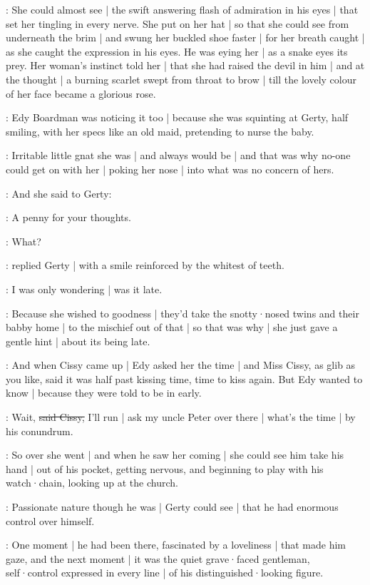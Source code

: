 \gertySex:
She could almost see |
the swift answering flash of admiration in his eyes |
that set her tingling
in every nerve.
She put on her hat |
so that she could see from underneath
the brim |
and swung her buckled shoe faster |
for her breath caught |
as she caught the expression
in his eyes.
He was eying her |
as a snake eyes its prey.
Her woman's instinct told her |
that she had raised the devil in him |
and at the thought |
a burning scarlet
swept from throat to brow |
till the lovely colour of her face
became a glorious rose.%

:
Edy Boardman was noticing it too |
because she was squinting at Gerty,
half smiling,
with her specs
like an old maid,
pretending to nurse the baby.

\gertyJudgy:
Irritable little gnat she was |
and always would be |
and that was why no-one could get on with her |
poking her nose |
into what was no concern of hers.

:
And she said to Gerty:

\edy:
A penny for your thoughts.

\gerty:
What?

:
replied Gerty |
with a smile reinforced by the whitest of teeth.

\gerty:
I was only wondering |
was it late.

\gertyJudgy:
Because she wished to goodness |
they'd take the snotty·nosed twins and their babby home |
to the mischief
out of that |%
so that was why |
she just gave a gentle hint |
about its being late.

:
And when Cissy came up |
Edy asked her the time |
and Miss Cissy,
as glib as you like,
said it was half past kissing time,
time to kiss again.
But Edy wanted to know |
because they were told
to be in early.

\cissy:
Wait,
\sout{said Cissy,}
I'll run |
ask my uncle Peter over there |
what's the time |
by his conundrum.

:
So over she went |
and when he saw her coming |
she could see him take his hand |
out of his pocket,
getting nervous,
and beginning to play with his watch·chain,
looking up at the church.

\gertySex:
Passionate nature though he was |
Gerty could see |
that he had enormous control over himself.%

\gertyNovel:
One moment |
he had been there,
fascinated by a loveliness |
that made him gaze,
and the next moment |
it was the quiet grave·faced gentleman,
self·control expressed in every line |
of his distinguished·looking figure.


